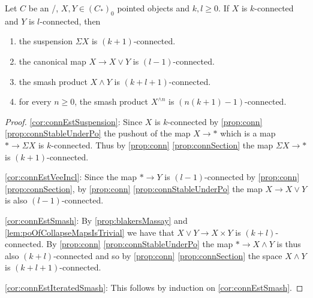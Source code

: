 \begin{corollary}\label{cor:connEst}
    Let $C$ be an \inftytop/, $X,Y\in \left(C_*\right)_0$ pointed objects and $k,l\geq 0$. 
    If $X$ is $k$-connected and $Y$ is $l$-connected, then
    \begin{enumerate}[label={(\roman*)}]
        \item the suspension $\Sigma X$ is $(k+1)$-connected. \label{cor:connEstSuspension}
        \item the canonical map $X\to X\vee Y$ is $(l-1)$-connected. \label{cor:connEstVeeIncl}
        \item the smash product $X\wedge Y$ is $(k + l + 1)$-connected. \label{cor:connEstSmash}
        \item for every $n\geq 0$, the smash product $X^{\wedge n}$ is $(n(k+1)-1)$-connected. \label{cor:connEstIteratedSmash}
    \end{enumerate}
    \begin{proof}
        \ref{cor:connEstSuspension}: Since $X$ is $k$-connected by \cref{prop:conn} \ref{prop:connStableUnderPo} the pushout of the map $X\to *$ which is a map $*\to \Sigma X$ is $k$-connected.
        Thus by \cref{prop:conn} \ref{prop:connSection} the map $\Sigma X\to *$ is $(k+1)$-connected.

        \ref{cor:connEstVeeIncl}: Since the map $*\to Y$ is $(l-1)$-connected by \cref{prop:conn} \ref{prop:connSection}, by \cref{prop:conn} \ref{prop:connStableUnderPo} the map $X\to X\vee Y$ is also $(l-1)$-connected.
        
        \ref{cor:connEstSmash}: By \cref{prop:blakersMassay} and \cref{lem:poOfCollapseMapsIsTrivial} we have that $X\vee Y\to X\times Y$ is  $(k+l)$-connected. 
        By \cref{prop:conn} \ref{prop:connStableUnderPo} the map $*\to X\wedge Y$ is thus also $(k+l)$-connected and so by \cref{prop:conn} \ref{prop:connSection} the space $X\wedge Y$ is $(k+l+1)$-connected.

        \ref{cor:connEstIteratedSmash}: This follows by induction on \ref{cor:connEstSmash}.
    \end{proof}
\end{corollary}
